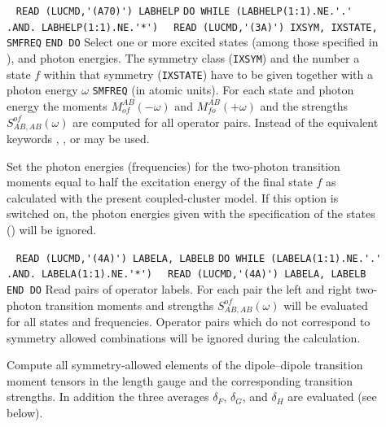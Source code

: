 \begin{description}
%
\item[] \verb| | \newline
\verb|READ (LUCMD,'(A70)') LABHELP|\newline
\verb|DO WHILE (LABHELP(1:1).NE.'.' .AND. LABHELP(1:1).NE.'*')|\newline
\verb|  READ (LUCMD,'(3A)') IXSYM, IXSTATE, SMFREQ|\newline
\verb|END DO| \newline
Select one or more excited states (among those specified
in ), and photon energies.
The symmetry class (\verb+IXSYM+) and the number a state $f$
within that symmetry (\verb+IXSTATE+) have to be given
together with a photon energy $\omega$ \verb+SMFREQ+ (in atomic units).
For each state and photon energy the moments 
$M^{AB}_{of}(-\omega)$ and $M^{AB}_{fo}(+\omega)$ and the
strengths $S^{of}_{AB,AB}(\omega)$ are computed for all operator pairs.
Instead of  the equivalent keywords ,
, or  may be used.
%
\item[] 
Set the photon energies (frequencies) for the two-photon transition moments
equal to  half the excitation energy of the final state $f$
as calculated with the present coupled-cluster model.
If this option is switched on, the photon energies given with the
specification of the states () will be ignored.
%
\item[] \verb| |\newline
\verb|READ (LUCMD,'(4A)') LABELA, LABELB|\newline
\verb|DO WHILE (LABELA(1:1).NE.'.' .AND. LABELA(1:1).NE.'*')|\newline
\verb|  READ (LUCMD,'(4A)') LABELA, LABELB|\newline
\verb|END DO|\newline
Read pairs of operator labels.
For each pair the left and right two-photon transition moments
and strengths $S^{of}_{AB,AB}(\omega)$ will be evaluated 
for all states and frequencies.
Operator pairs which do not correspond to symmetry allowed
combinations will be ignored during the calculation.
%
\item[] 
Compute all symmetry-allowed elements of the dipole--dipole 
transition moment tensors in the length gauge
and the corresponding transition strengths.
In addition the three averages $\delta_F$, $\delta_G$, and $\delta_H$
are evaluated (see below).
%
\item[]

\end{description}
